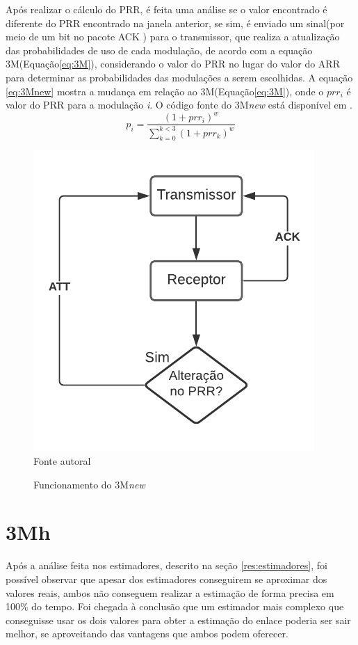Após realizar o cálculo do PRR, é feita uma análise se o valor encontrado é diferente do PRR encontrado na janela anterior, se sim, é enviado um sinal(por meio de um bit no pacote ACK
) para o transmissor, que realiza a atualização das probabilidades de uso de cada modulação, de acordo com a equação 3M(Equação\ref{eq:3M}), considerando o valor do PRR no lugar do valor do ARR para determinar as probabilidades das modulações a serem escolhidas. A equação \ref{eq:3Mnew} mostra a mudança em relação ao 3M(Equação\ref{eq:3M}), onde o $prr_i$ é valor do PRR para a modulação \textit{i}. O código fonte do 3M\textit{new} está disponível em \cite{GitDiego}.
\begin{equation}
\label{eq:3Mnew}
p_i = \frac{{(1+prr_i)}^w}{\sum_{k=0}^{k<3}{(1+prr_k)}^w}
\end{equation}

\begin{figure}
    \centering
    \caption{Funcionamento do 3M\textit{new}}
    \includegraphics{sections/textual/Imagens/3Mnew.pdf} \\ Fonte autoral
    \label{fig:3Mnew}
\end{figure}

\newpage
\section{3Mh}

Após a análise feita nos estimadores, descrito na seção \ref{res:estimadores}, foi possível observar que apesar dos estimadores conseguirem se aproximar dos valores reais, ambos não conseguem realizar a estimação de forma precisa em 100\% do tempo. Foi chegada à conclusão que um estimador mais complexo que conseguisse usar os dois valores para obter a estimação do enlace poderia ser sair melhor, se aproveitando das vantagens que ambos podem oferecer. 

